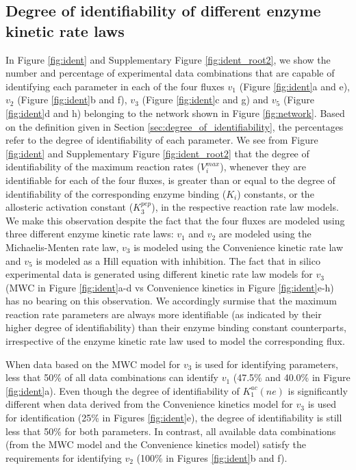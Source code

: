 \documentclass[10pt]{article}
\begin{document}
	\subsection{Degree of identifiability of different enzyme kinetic rate laws}\label{sec:ident_rate_laws}		
	In Figure \ref{fig:ident} and Supplementary Figure \ref{fig:ident_root2}, we show the number and percentage of experimental data combinations that are capable of identifying each parameter in each of the four fluxes $v_1$ (Figure \ref{fig:ident}a and e), $v_2$ (Figure \ref{fig:ident}b and f), $v_3$ (Figure \ref{fig:ident}c and g) and $v_5$ (Figure \ref{fig:ident}d and h) belonging to the network shown in Figure \ref{fig:network}. Based on the definition given in Section \ref{sec:degree_of_identifiability}, the percentages refer to the degree of identifiability of each parameter. We see from Figure \ref{fig:ident} and Supplementary Figure \ref{fig:ident_root2} that the degree of identifiability of the maximum reaction rates ($V_i^{max}$), whenever they are identifiable for each of the four fluxes, is greater than or equal to the degree of identifiability of the corresponding enzyme binding ($K_i$) constants, or the allosteric activation constant ($K_3^{pep}$), in the respective reaction rate law models. We make this observation despite the fact that the four fluxes are modeled using three different enzyme kinetic rate laws: $v_1$ and $v_2$ are modeled using the Michaelis-Menten rate law, $v_3$ is modeled using the Convenience kinetic rate law and $v_5$ is modeled as a Hill equation with inhibition. The fact that in silico experimental data is generated using different kinetic rate law models for $v_3$ (MWC in Figure \ref{fig:ident}a-d vs Convenience kinetics in Figure \ref{fig:ident}e-h) has no bearing on this observation. We accordingly surmise that the maximum reaction rate parameters are always more identifiable (as indicated by their higher degree of identifiability) than their enzyme binding constant counterparts, irrespective of the enzyme kinetic rate law used to model the corresponding flux.
	
	When data based on the MWC model for $v_3$ is used for identifying parameters, less that 50\% of all data combinations can identify $v_1$ (47.5\% and 40.0\% in Figure \ref{fig:ident}a). Even though the degree of identifiability of $K_1^{ac}(ne)$ is significantly different when data derived from the Convenience kinetics model for $v_3$ is used for identification (25\% in Figures \ref{fig:ident}e), the degree of identifiability is still less that 50\% for both parameters. In contrast, all available data combinations (from the MWC model and the Convenience kinetics model) satisfy the requirements for identifying $v_2$ (100\% in Figures \ref{fig:ident}b and f).
	
\end{document}
